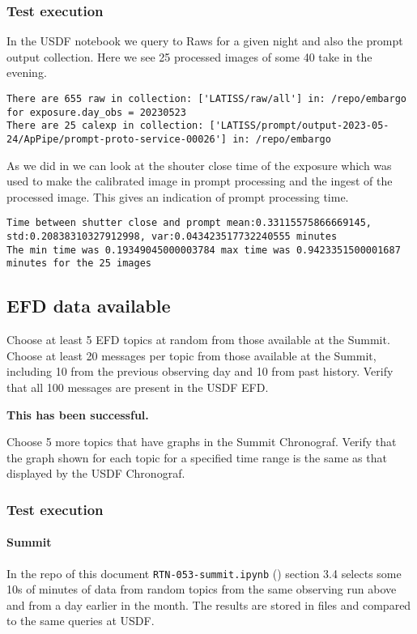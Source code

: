 \subsubsection{Test execution}
In the USDF notebook we query to Raws for a given night and also the prompt output collection.
Here we see  25 processed images of some 40 take in the evening.

\begin{lstlisting}
There are 655 raw in collection: ['LATISS/raw/all'] in: /repo/embargo for exposure.day_obs = 20230523
There are 25 calexp in collection: ['LATISS/prompt/output-2023-05-24/ApPipe/prompt-proto-service-00026'] in: /repo/embargo
\end{lstlisting}

As we did in  we can look at the shouter close time of the exposure which was used to make the calibrated image in prompt processing and the ingest of the processed image.
This gives an indication of prompt processing time.
\begin{lstlisting}
Time between shutter close and prompt mean:0.33115575866669145, std:0.20838310327912998, var:0.043423517732240555 minutes
The min time was 0.19349045000003784 max time was 0.9423351500001687 minutes for the 25 images
\end{lstlisting}


\subsection{EFD data available }
Choose at least 5 EFD topics at random from those available at the Summit.
Choose at least 20 messages per topic from those available at the Summit, including 10 from the previous observing day and 10 from past history.
Verify that all 100 messages are present in the USDF EFD.

\textbf{This has been successful.}

Choose 5 more topics that have graphs in the Summit Chronograf.
Verify that the graph shown for each topic for a specified time range is the same as that displayed by the USDF Chronograf.
\subsubsection{Test execution}
\paragraph{Summit} \label{sec:efdsummit}
In the repo of this document \texttt{RTN-053-summit.ipynb} ()  section 3.4
selects some 10s of minutes of data from random topics from the same observing run above and from a day earlier in the month.
The results are stored in files and compared to the same  queries at USDF.

